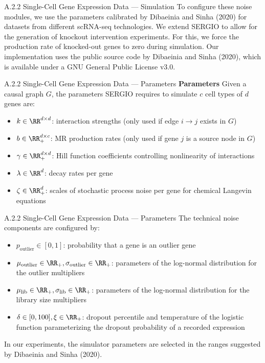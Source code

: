\documentclass[aspectratio=169,10pt]{beamer}
\newcommand{\scrna}{{scRNA-seq}\xspace}
\newcommand{\sergio}{{SERGIO}\xspace}
\begin{document}
\begin{frame}{A.2.2 Single-Cell Gene Expression Data --- Simulation}
To configure these noise modules, we use the parameters calibrated by Dibaeinia and Sinha (2020) for datasets from different \scrna technologies. We extend \sergio to allow for the generation of knockout intervention experiments. For this, we force the production rate of knocked-out genes to zero during simulation. Our implementation uses the public source code by Dibaeinia and Sinha (2020), which is available under a GNU General Public License v3.0.
\end{frame}

\begin{frame}{A.2.2 Single-Cell Gene Expression Data --- Parameters}
\small
\textbf{Parameters}\quad
Given a causal graph $G$, the parameters \sergio requires to simulate $c$ cell types of $d$ genes are:
\begin{itemize}
    \item $k \in \RR^{d \times d}$: interaction strengths (only used if edge $i\rightarrow j$ exists in $G$)
    \item $b \in \RR_+^{d \times c}$: MR production rates (only used if gene $j$ is a source node in $G$)
    \item $\gamma \in \RR_+^{d \times d}$: Hill function coefficients controlling nonlinearity of interactions
    \item $\lambda \in \RR^{d}$: decay rates per gene
    \item $\zeta \in \RR^{d}_+$: scales of stochastic process noise per gene for chemical Langevin equations
\end{itemize}
\end{frame}

\begin{frame}{A.2.2 Single-Cell Gene Expression Data --- Parameters}
\small
The technical noise components are configured by:
\begin{itemize}
    \item $p_{\text{outlier}} \in [0,1]$: probability that a gene is an outlier gene
    \item $\mu_{\text{outlier}} \in \RR_+, \sigma_{\text{outlier}} \in \RR_+$: parameters of the log-normal distribution for the outlier multipliers
    \item $\mu_{\text{lib}} \in \RR_+, \sigma_{\text{lib}} \in \RR_+$: parameters of the log-normal distribution for the library size multipliers
    \item $\delta \in [0,100], \xi \in \RR_+$: dropout percentile and temperature of the logistic function parameterizing the dropout probability of a recorded expression
\end{itemize}
In our experiments, the simulator parameters are selected in the ranges suggested by Dibaeinia and Sinha (2020).
\end{frame}
\end{document}

